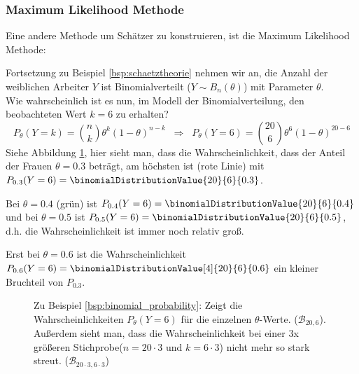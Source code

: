 \ifdefined\uebsps
\newExercPage
\setcounter{Exercise}{5}

\fi

\subsubsection{Maximum Likelihood Methode}
Eine andere Methode um Schätzer zu konstruieren, ist die Maximum Likelihood Methode:

{
    \def\nval{20}
    \def\kval{6}
\begin{bsp} Fortsetzung zu Beispiel \ref{bsp:schaetztheorie}
    \label{bsp:binomial_probability}
nehmen wir an, die Anzahl der weiblichen Arbeiter $Y$ ist Binomialverteilt ($Y\sim B_n(\theta)$) mit Parameter $\theta$. \\
Wie wahrscheinlich ist es nun, im Modell der Binomialverteilung, den beobachteten Wert $k=\kval$ zu erhalten?
\[P_\theta(Y=k)=\binom{n}{k}\theta^k(1-\theta)^{n-k}\;\;\Rightarrow\;\;P_\theta(Y=6)=\binom{\nval}{\kval}\theta^\kval(1-\theta)^{\nval-\kval}\]
Siehe Abbildung \ref{fig:binomial_probability}, hier sieht man, dass die Wahrscheinlichkeit, dass der Anteil der Frauen $\theta=0.3$ beträgt, am höchsten ist (rote Linie) mit $P_{0.3}(Y=\kval)=\binomialDistributionValue{\nval}{\kval}{0.3}$.

Bei $\theta=0.4$ (grün) ist $P_{0.4}(Y=\kval)=\binomialDistributionValue{\nval}{\kval}{0.4}$ und bei $\theta=0.5$ ist $P_{0.5}(Y=\kval)=\binomialDistributionValue{\nval}{\kval}{0.5}$, d.h. die Wahrscheinlichkeit ist immer noch relativ groß. 

Erst bei $\theta=0.6$ ist die Wahrscheinlichkeit $P_{0.6}(Y=\kval)=\binomialDistributionValue[4]{\nval}{\kval}{0.6}$ ein kleiner Bruchteil von $P_{0.3}$.

\end{bsp}
\begin{figure}
     \centering
    \begin{tikzpicture}
    \end{tikzpicture}
    \caption{Zu Beispiel \ref{bsp:binomial_probability}: Zeigt die Wahrscheinlichkeiten $P_\theta(Y=\kval)$ für die einzelnen $\theta$-Werte. ($\mathcal{B}_{\nval,\kval}$). Außerdem sieht man, dass die Wahrscheinlichkeit bei einer 3x größeren Stichprobe($n=\nval\cdot3$ und $k=\kval\cdot 3$) nicht mehr so stark streut. ($\mathcal{B}_{\nval\cdot 3,\kval\cdot 3}$)}
    \label{fig:binomial_probability}
\end{figure}
}

